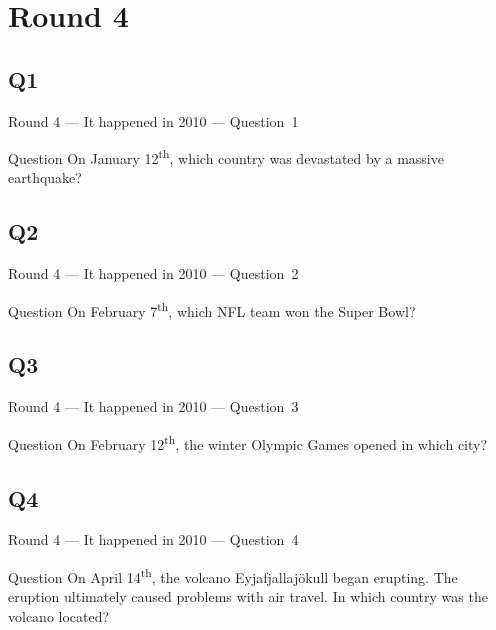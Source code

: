\documentclass[11pt]{beamer}
\begin{document}
\section{Round 4}
\subsection*{Q1}
\begin{frame}[t]{Round 4 --- It happened in 2010 --- \mbox{Question 1}}
\vspace{-0.5em}
\begin{block}{Question}
On January 12\textsuperscript{th}, which country was devastated by a massive earthquake?
\end{block}
\end{frame}
\subsection*{Q2}
\begin{frame}[t]{Round 4 --- It happened in 2010 --- \mbox{Question 2}}
\vspace{-0.5em}
\begin{block}{Question}
On February 7\textsuperscript{th}, which NFL  team won the Super Bowl?
\end{block}
\end{frame}
\subsection*{Q3}
\begin{frame}[t]{Round 4 --- It happened in 2010 --- \mbox{Question 3}}
\vspace{-0.5em}
\begin{block}{Question}
On February 12\textsuperscript{th}, the winter Olympic Games opened in which city?
\end{block}
\end{frame}
\subsection*{Q4}
\begin{frame}[t]{Round 4 --- It happened in 2010 --- \mbox{Question 4}}
\vspace{-0.5em}
\begin{block}{Question}
On April 14\textsuperscript{th}, the volcano Eyjafjallajökull began erupting. The eruption ultimately caused problems with air travel. In which country was the volcano located?
\end{block}
\end{frame}
\end{document}
